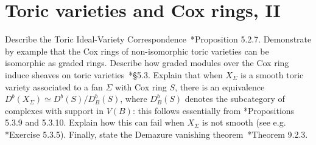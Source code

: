 \documentclass[11pt]{amsart}
\numberwithin{equation}{section}
\theoremstyle{definition}
\theoremstyle{remark}
\newcommand{\PP}{\mathbb P}
\newcommand{\Spec}{\operatorname{Spec}}
\begin{document}
\section{Toric varieties and Cox rings, II}
Describe the Toric Ideal-Variety Correspondence~\cite{CLS}*{Proposition 5.2.7}. Demonstrate by example that the Cox rings of non-isomorphic toric varieties can be isomorphic as graded rings. Describe how graded modules over the Cox ring induce sheaves on toric varieties~\cite{CLS}*{\S 5.3}. Explain that when $X_\Sigma$ is a smooth toric variety associated to a fan $\Sigma$ with Cox ring $S$, there is an equivalence $D^b(X_\Sigma) \simeq D^b(S) / D^b_B(S)$, where $D^b_B(S)$ denotes the subcategory of complexes with support in $V(B)$: this follows essentially from \cite{CLS}*{Propositions 5.3.9 and 5.3.10}. Explain how this can fail when $X_\Sigma$ is not smooth (see e.g. \cite{CLS}*{Exercise 5.3.5}).  %
Finally, state the Demazure vanishing theorem~\cite{CLS}*{Theorem 9.2.3}. 













\end{document}
